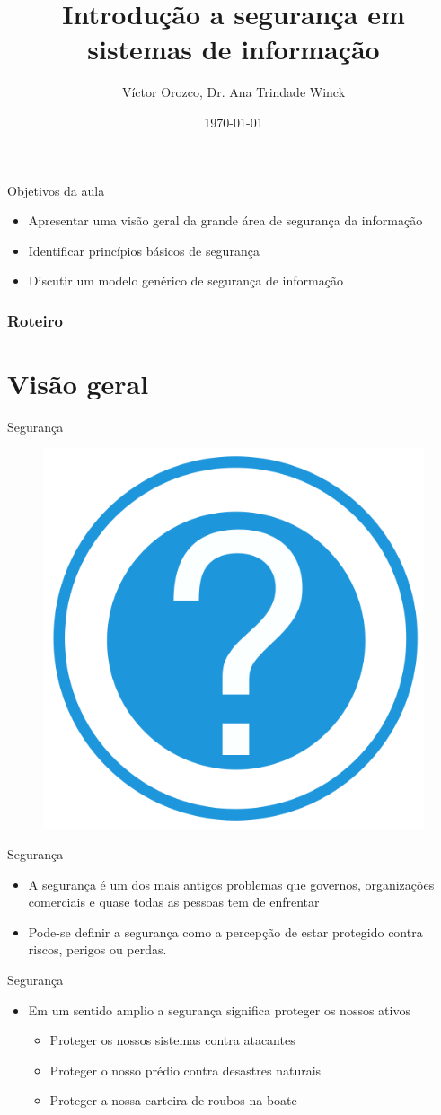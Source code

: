 \documentclass{beamer}
\title{Introdução a segurança em sistemas de informação}
\author[Lopez. V.L.O, Winck. A. T]{Víctor Orozco, Dr. Ana Trindade Winck}
\institute[UFSM]{
  Centro de Tecnologia \\
  Universidade Federal de Santa Maria
}
\date{\today}
\begin{document}
\begin{frame}[Plain]
\titlepage
\end{frame}

\begin{frame}{Objetivos da aula}
\begin{itemize}
\item Apresentar uma visão geral da grande área de segurança da informação
\item Identificar princípios básicos de segurança
\item Discutir um modelo genérico de segurança de informação
\end{itemize}
\end{frame}

\begin{frame}
\frametitle{Roteiro}
\tableofcontents
\end{frame} 

\section{Visão geral}
\begin{frame}{Segurança}
\begin{figure}[tbph]
\centering
\includegraphics[width=0.3\linewidth]{./question}
\label{fig:question}
\end{figure}
\end{frame}

\begin{frame}{Segurança}
\begin{itemize}
\item A segurança é um dos mais antigos problemas que governos, organizações comerciais e quase todas as pessoas tem de enfrentar
\item Pode-se definir a segurança como a percepção de estar protegido contra riscos, perigos ou perdas.
\end{itemize}
\end{frame}

\begin{frame}{Segurança}
\begin{itemize}
\item Em um sentido amplio a segurança significa proteger os nossos ativos
\begin{itemize}
\item Proteger os nossos sistemas contra atacantes
\item Proteger o nosso prédio contra desastres naturais
\item Proteger a nossa carteira de roubos na boate
\end{itemize}
\end{itemize}
\end{frame}
\end{document}
